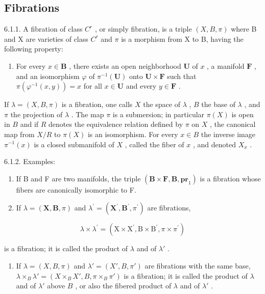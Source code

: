 \subsection{Fibrations}

6.1.1. A fibration of class \(C^{r}\) , or simply fibration, is a triple \((X, B, \pi)\) where B and X are varieties of class \(C^{r}\) and \(\pi\) is a morphism from X to B, having the following property:

\begin{enumerate}
\def\labelenumi{(\Alph{enumi})}
\setcounter{enumi}{5}
\tightlist
\item
  For every \(x \in \mathbf{B}\) , there exists an open neighborhood \(\mathbf{U}\) of \(x\) , a manifold \(\mathbf{F}\) , and an isomorphism \(\varphi\) of \(\pi^{-1}(\mathbf{U})\) onto \(\mathbf{U} \times \mathbf{F}\) such that \(\pi(\varphi^{-1}(x, y)) = x\) for all \(x \in \mathbf{U}\) and every \(y \in \mathbf{F}\) .
\end{enumerate}

If \(\lambda = (X, B, \pi)\) is a fibration, one calls \(X\) the space of \(\lambda\) , \(B\) the base of \(\lambda\) , and \(\pi\) the projection of \(\lambda\) . The map \(\pi\) is a submersion; in particular \(\pi(X)\) is open in \(B\) and if \(R\) denotes the equivalence relation defined by \(\pi\) on \(X\) , the canonical map from \(X/R\) to \(\pi(X)\) is an isomorphism. For every \(x \in B\) the inverse image \(\pi^{-1}(x)\) is a closed submanifold of \(X\) , called the fiber of \(x\) , and denoted \(X_x\) .

6.1.2. Examples:

\begin{enumerate}
\def\labelenumi{(\alph{enumi})}
\item
  If B and F are two manifolds, the triple \((\mathbf{B} \times \mathbf{F}, \mathbf{B}, \mathbf{pr}_{1})\) is a fibration whose fibers are canonically isomorphic to F.
\item
  If \(\lambda = (\mathbf{X},\mathbf{B},\pi)\) and \(\lambda^{\prime} = (\mathbf{X}^{\prime},\mathbf{B}^{\prime},\pi^{\prime})\) are fibrations,
\end{enumerate}

\[
\lambda \times \lambda^ {\prime} = (\mathrm{X} \times \mathrm{X} ^ {\prime}, \mathrm{B} \times \mathrm{B} ^ {\prime}, \pi \times \pi^ {\prime})
\]

is a fibration; it is called the product of \(\lambda\) and of \(\lambda'\) .

\begin{enumerate}
\def\labelenumi{(\alph{enumi})}
\setcounter{enumi}{2}
\tightlist
\item
  If \(\lambda = (X, B, \pi)\) and \(\lambda' = (X', B, \pi')\) are fibrations with the same base, \(\lambda \times_{B} \lambda' = (X \times_{B} X', B, \pi \times_{B} \pi')\) is a fibration; it is called the product of \(\lambda\) and of \(\lambda'\) above \(B\) , or also the fibered product of \(\lambda\) and of \(\lambda'\) .
\end{enumerate}

